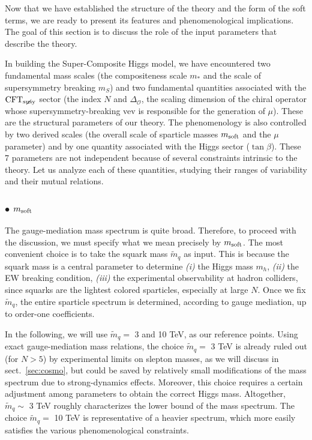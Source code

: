 \documentclass[a4paper,12pt]{article}
\def\sec#1{sect.~\ref{#1}}
\def\O{\mathcal{O}}
\def\mst{m_*}
\def\mS{m_S}
\def\msoft{m_{\rm soft}}
\def\CFTs{{\rm CFT}_ {{\rm susy}\! \! \! \! \! \! \! \!\diagup \,\,\,}}
\begin{document}
Now that we have established the structure of the theory and the form of the soft terms, we are ready to present its features and phenomenological implications. The goal of this section is to discuss the role of the input parameters that describe the theory. 

In building the Super-Composite Higgs model, we have encountered two fundamental mass scales (the compositeness scale $\mst$ and the scale of supersymmetry breaking $\mS$) and two fundamental quantities associated with the $\CFTs$ sector (the index $N$ and $\Delta_\O$, the scaling dimension of the chiral operator whose supersymmetry-breaking vev is responsible for the generation of $\mu$). These are the structural parameters of our theory. The phenomenology is also controlled by two derived
scales (the overall scale of sparticle masses $\msoft$ and the $\mu$ parameter) and  by one quantity associated with the Higgs sector ($\tan\beta$). These 7 parameters are not independent because of several constraints intrinsic to the theory. Let us analyze each of these quantities, studying their ranges of variability and their mutual relations.

\boldmath
\subsubsection*{$\bullet$ $\msoft$}
\unboldmath

The gauge-mediation mass spectrum is quite broad. Therefore, to proceed with the discussion, we must specify what we mean precisely by $\msoft$. The most convenient choice is to take the squark mass ${\tilde m}_q$ as input. This is because the squark mass is a central parameter to determine {\it (i)} the Higgs mass $m_h$, {\it (ii)} the EW breaking condition, {\it (iii)} the experimental observability at hadron colliders, since squarks are the lightest colored sparticles, especially at large $N$. Once we fix ${\tilde m}_q$, the entire sparticle spectrum is determined, according to gauge mediation, up to order-one coefficients.

In the following, we will use ${\tilde m}_q =$ 3 and 10 TeV, as our reference points. Using exact gauge-mediation mass relations, the choice ${\tilde m}_q =$ 3 TeV is already ruled out (for $N>5$) by experimental limits on slepton masses, as we will discuss in \sec{sec:cosmo}, but could be saved by relatively small modifications of the mass spectrum due to strong-dynamics effects. Moreover, this choice requires a certain adjustment among parameters to obtain the correct Higgs mass. Altogether, ${\tilde m}_q \sim $ 3 TeV roughly characterizes the lower bound of the mass spectrum. The choice ${\tilde m}_q = $ 10 TeV is representative of a heavier spectrum, which more easily satisfies the various phenomenological constraints.
 
\end{document}

